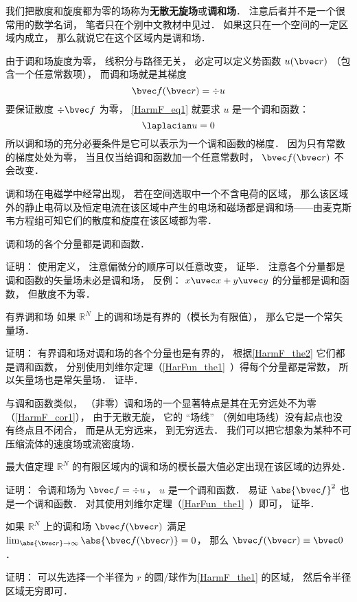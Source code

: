 

我们把散度和旋度都为零的场称为\textbf{无散无旋场}或\textbf{调和场}． 注意后者并不是一个很常用的数学名词， 笔者只在个别中文教材中见过． 如果这只在一个空间的一定区域内成立， 那么就说它在这个区域内是调和场．

由于调和场旋度为零， 线积分与路径无关， 必定可以定义势函数 $u(\bvec r)$ （包含一个任意常数项）， 而调和场就是其梯度
\begin{equation}\label{HarmF_eq1}
\bvec f(\bvec r) = \div u
\end{equation}
要保证散度 $\div \bvec f$ 为零， \autoref{HarmF_eq1} 就要求 $u$ 是一个调和函数：
\begin{equation}
\laplacian u = 0
\end{equation}
所以调和场的充分必要条件是它可以表示为一个调和函数的梯度． 因为只有常数的梯度处处为零， 当且仅当给调和函数加一个任意常数时， $\bvec f(\bvec r)$ 不会改变．

调和场在电磁学中经常出现， 若在空间选取中一个不含电荷的区域， 那么该区域外的静止电荷以及恒定电流在该区域中产生的电场和磁场都是调和场——由麦克斯韦方程组可知它们的散度和旋度在该区域都为零．

\begin{theorem}{}\label{HarmF_the2}
调和场的各个分量都是调和函数．
\end{theorem}
证明： 使用定义， 注意偏微分的顺序可以任意改变， 证毕． 注意各个分量都是调和函数的矢量场未必是调和场， 反例： $x\uvec x + y \uvec y$ 的分量都是调和函数， 但散度不为零．

\begin{corollary}{有界调和场}
如果 $\mathbb R^N$ 上的调和场是有界的（模长为有限值）， 那么它是一个常矢量场．
\end{corollary}
证明： 有界调和场对调和场的各个分量也是有界的， 根据\autoref{HarmF_the2} 它们都是调和函数， 分别使用刘维尔定理（\autoref{HarFun_the1}~）得每个分量都是常数， 所以矢量场也是常矢量场． 证毕．

与调和函数类似， （非零）调和场的一个显著特点是其在无穷远处不为零（\autoref{HarmF_cor1}）， 由于无散无旋， 它的 “场线” （例如电场线）没有起点也没有终点且不闭合， 而是从无穷远来， 到无穷远去． 我们可以把它想象为某种不可压缩流体的速度场或流密度场．

\begin{theorem}{最大值定理}\label{HarmF_the1}
$\mathbb R^N$ 的有限区域内的调和场的模长最大值必定出现在该区域的边界处．
\end{theorem}
证明： 令调和场为 $\bvec f = \div u$， $u$ 是一个调和函数． 易证 $\abs{\bvec f}^2$ 也是一个调和函数． 对其使用刘维尔定理（\autoref{HarFun_the1}~）即可， 证毕．

\begin{corollary}{}\label{HarmF_cor1}
如果 $\mathbb R^N$ 上的调和场 $\bvec f(\bvec r)$ 满足 $\lim_{\abs{\bvec r}\to \infty} \abs{\bvec f(\bvec r)}  = 0$， 那么 $\bvec f(\bvec r) \equiv \bvec 0$．
\end{corollary}
证明： 可以先选择一个半径为 $r$ 的圆/球作为\autoref{HarmF_the1} 的区域， 然后令半径区域无穷即可．
